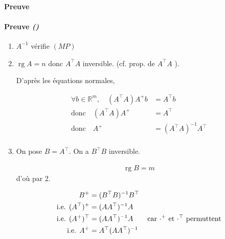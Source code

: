 \documentclass{article}
\newcommand{\rg}{\operatorname{rg}}
\newcommand{\R}{\mathbb{R}}
\newenvironment{proof}[1][\unskip]{
	\def\temp{#1}\ifx\temp\empty
		\paragraph{Preuve}
	\else
		\paragraph{Preuve \emph{(#1)}}
	\fi

}{}
\begin{document}
\begin{proof}
   \begin{enumerate}
       \item $A^{-1}$ vérifie $(MP)$
        \item $\rg A = n$ donc $A^\top A$ inversible. (cf. prop. de $A^\top A$ ).

            D'après les équations normales, 

            \begin{align*}
                \forall b\in \R^m,\quad (A^\top A) A ^+ b &= A^\top b \\
                \text{donc}\quad (A^\top A) A^+ &= A^\top  \\
                \text{donc}\quad A^+ &= (A^\top A)^{-1} A^\top  \\
            \end{align*}

        \item On pose $B = A^\top $. On a $B^\top B$ inversible.

            \begin{align*}
                \rg B = m
            \end{align*}
            d'où par 2.

            \begin{align*}
                B^+ &= (B^\top B)^{-1} B^\top \\
                \text{i.e. }(A^\top )^+ &= (A A^\top )^{-1} A \\
                \text{i.e. }(A^{+})^\top &= (A A^\top )^{-1} A \quad&\text{car $ \cdot ^+$ et $ \cdot ^\top $ permuttent} \\
                \text{i.e. }A^+ &= A^\top  (A A^\top )^{-1} \\
            \end{align*}
   \end{enumerate} 
\end{proof}
\end{document}
